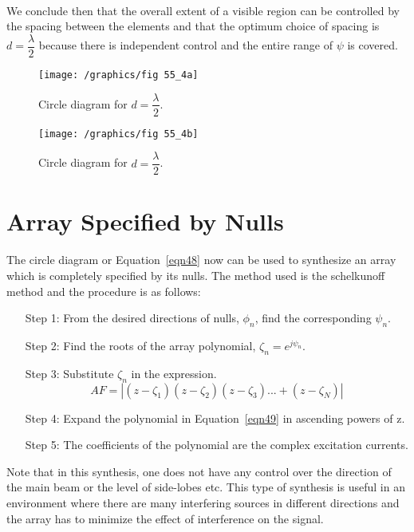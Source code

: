 \paragraph{}
We conclude then that the overall extent of a visible region can be controlled by the spacing between the elements and that the optimum choice of spacing is $d=\dfrac{\lambda}{2}$ because there is independent control and the entire range of $\psi$ is covered.
\begin{figure}[h]
\centering
\begin{minipage}[b]{0.4\textwidth}
\texttt{[image: /graphics/fig 55\_4a]}
\caption{Circle diagram for $d=\dfrac{\lambda}{2}$.}
\label{fig:fig-55_4a}
\end{minipage}
\hfill
\begin{minipage}[b]{0.4\textwidth}
\texttt{[image: /graphics/fig 55\_4b]}
\caption{Circle diagram for $d=\dfrac{\lambda}{2}$.}
\label{fig:fig-55_4a}
\end{minipage}
\end{figure}

\section{Array Specified by Nulls}
The circle diagram or Equation~\ref{eqn48} now can be used to synthesize an array which is completely specified by its nulls. The method used is the schelkunoff method and the procedure is as follows: 

\begin{enumerate}
\item[Step 1:] From the desired directions of nulls, $\phi_{n}$, find the corresponding $\psi_{n}$.
\item[Step 2:] Find the roots of the array polynomial, $\zeta
_n = e^{j\psi_{n}}$.
\item[Step 3:] Substitute $\zeta_n$ in the expression.
\begin{equation}
AF=|(z-\zeta_1)(z-\zeta_2)(z-\zeta_3)...+(z-\zeta_N)|
\label{eqn49}
\end{equation}
\item[Step 4:] Expand the polynomial in Equation~\ref{eqn49} in ascending powers of z.
\item[Step 5:] The coefficients of the polynomial are the complex excitation currents.
\end{enumerate}

Note that in this synthesis, one does not have any control over the direction of the main beam or the level of side-lobes etc. This type of synthesis is useful in an environment where there are many interfering sources in different directions and the array has to minimize the effect of interference on the signal.

